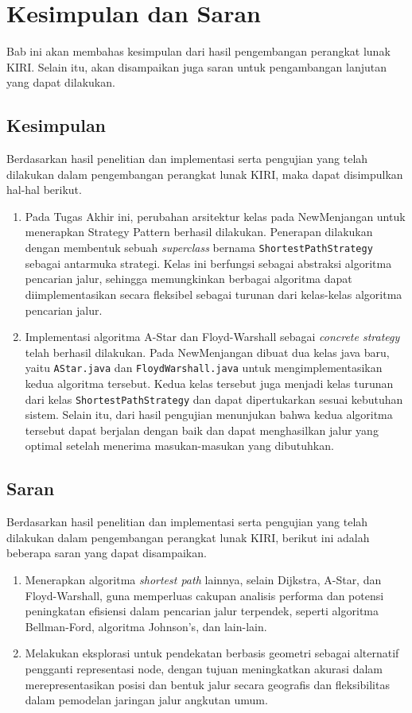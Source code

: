 \chapter{Kesimpulan dan Saran}
\label{chap:kesimpulandansaran}
Bab ini akan membahas kesimpulan dari hasil pengembangan perangkat lunak KIRI. Selain itu, akan disampaikan juga saran untuk pengambangan lanjutan yang dapat dilakukan.
\section{Kesimpulan}
Berdasarkan hasil penelitian dan implementasi serta pengujian yang telah dilakukan dalam pengembangan perangkat lunak KIRI, maka dapat disimpulkan hal-hal berikut.
\begin{enumerate}
    \item Pada Tugas Akhir ini, perubahan arsitektur kelas pada NewMenjangan untuk menerapkan Strategy Pattern berhasil dilakukan. Penerapan dilakukan dengan membentuk sebuah \textit{superclass} bernama \texttt{ShortestPathStrategy} sebagai antarmuka strategi. Kelas ini berfungsi sebagai abstraksi algoritma pencarian jalur, sehingga memungkinkan berbagai algoritma dapat diimplementasikan secara fleksibel sebagai turunan dari kelas-kelas algoritma pencarian jalur.
    \item Implementasi algoritma A-Star dan Floyd-Warshall sebagai \textit{concrete strategy} telah berhasil dilakukan. Pada NewMenjangan dibuat dua kelas java baru, yaitu \texttt{AStar.java} dan \texttt{FloydWarshall.java} untuk mengimplementasikan kedua algoritma tersebut. Kedua kelas tersebut juga menjadi kelas turunan dari kelas \texttt{ShortestPathStrategy} dan dapat dipertukarkan sesuai kebutuhan sistem. Selain itu, dari hasil pengujian menunjukan bahwa kedua algoritma tersebut dapat berjalan dengan baik dan dapat menghasilkan jalur yang optimal setelah menerima masukan-masukan yang dibutuhkan.
\end{enumerate}

\section{Saran}
Berdasarkan hasil penelitian dan implementasi serta pengujian yang telah dilakukan dalam pengembangan perangkat lunak KIRI, berikut ini adalah beberapa saran yang dapat disampaikan.
\begin{enumerate}
    \item Menerapkan algoritma \textit{shortest path} lainnya, selain Dijkstra, A-Star, dan Floyd-Warshall, guna memperluas cakupan analisis performa dan potensi peningkatan efisiensi dalam pencarian jalur terpendek, seperti algoritma Bellman-Ford, algoritma Johnson's, dan lain-lain.
    \item Melakukan eksplorasi untuk pendekatan berbasis geometri sebagai alternatif pengganti representasi node, dengan tujuan meningkatkan akurasi dalam merepresentasikan posisi dan bentuk jalur secara geografis dan fleksibilitas dalam pemodelan jaringan jalur angkutan umum.
\end{enumerate}